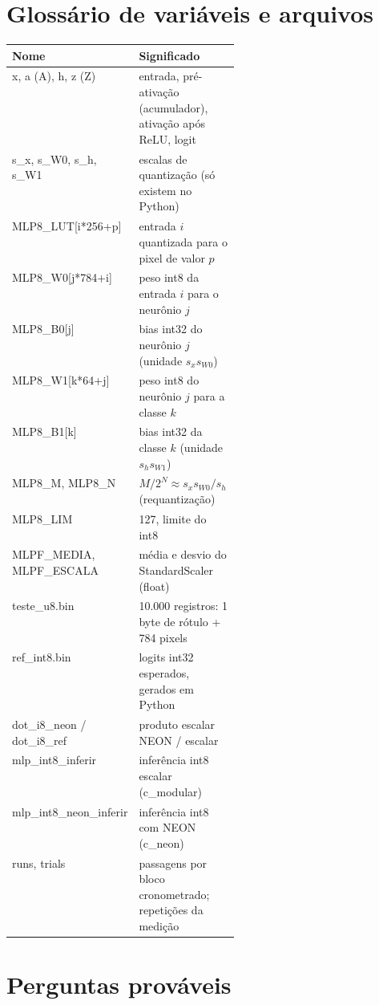 \documentclass[10pt]{article}
\begin{document}
\section{Glossário de variáveis e arquivos}

\begin{center}\footnotesize
\begin{tabularx}{\linewidth}{@{}>{\ttfamily\raggedright\arraybackslash}p{0.33\linewidth} L@{}}
\toprule
\normalfont Nome & Significado \\
\midrule
x, a (A), h, z (Z) & entrada, pré-ativação (acumulador), ativação após ReLU, logit \\
s\_x, s\_W0, s\_h, s\_W1 & escalas de quantização (só existem no Python) \\
MLP8\_LUT[i*256+p] & entrada $i$ quantizada para o pixel de valor $p$ \\
MLP8\_W0[j*784+i] & peso int8 da entrada $i$ para o neurônio $j$ \\
MLP8\_B0[j] & bias int32 do neurônio $j$ (unidade $s_x s_{W0}$) \\
MLP8\_W1[k*64+j] & peso int8 do neurônio $j$ para a classe $k$ \\
MLP8\_B1[k] & bias int32 da classe $k$ (unidade $s_h s_{W1}$) \\
MLP8\_M, MLP8\_N & $M/2^N \approx s_x s_{W0}/s_h$ (requantização) \\
MLP8\_LIM & 127, limite do int8 \\
MLPF\_MEDIA, MLPF\_ESCALA & média e desvio do StandardScaler (float) \\
teste\_u8.bin & 10.000 registros: 1 byte de rótulo + 784 pixels \\
ref\_int8.bin & logits int32 esperados, gerados em Python \\
dot\_i8\_neon / dot\_i8\_ref & produto escalar NEON / escalar \\
mlp\_int8\_inferir & inferência int8 escalar (c\_modular) \\
mlp\_int8\_neon\_inferir & inferência int8 com NEON (c\_neon) \\
runs, trials & passagens por bloco cronometrado; repetições da medição \\
\bottomrule
\end{tabularx}
\end{center}

\section{Perguntas prováveis}
\end{document}
